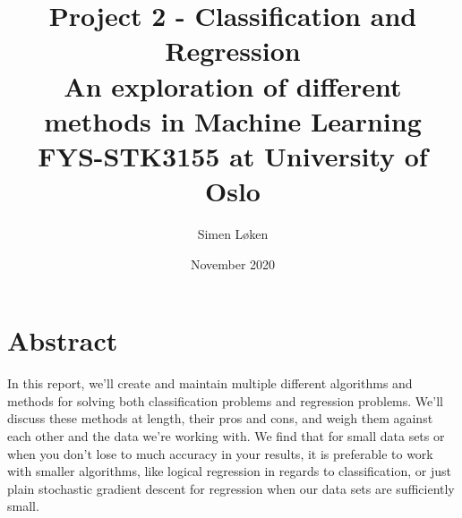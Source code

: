 \documentclass{article}
\title{%
Project 2 - Classification and Regression\\
\Large An exploration of different methods in Machine Learning \\
\large FYS-STK3155 at University of Oslo}
\author{Simen Løken}
\date{November 2020}
\begin{document}
\nocite{articleMedium}
\nocite{mnist}
\nocite{proj2}
\maketitle
\section{Abstract}
In this report, we'll create and maintain multiple different algorithms and methods for solving both classification problems and regression problems. We'll discuss these methods at length, their pros and cons, and weigh them against each other and the data we're working with. We find that for small data sets or when you don't lose to much accuracy in your results, it is preferable to work with smaller algorithms, like logical regression in regards to classification, or just plain stochastic gradient descent for regression when our data sets are sufficiently small.
\end{document}
